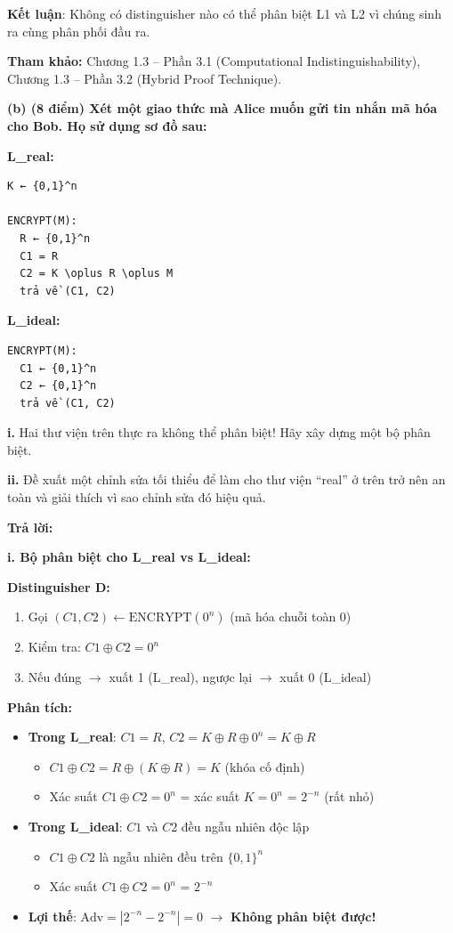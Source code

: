 \textbf{Kết luận}: Không có distinguisher nào có thể phân biệt L1 và L2 vì chúng sinh ra cùng phân phối đầu ra.

\textbf{Tham khảo:} Chương 1.3 – Phần 3.1 (Computational Indistinguishability), Chương 1.3 – Phần 3.2 (Hybrid Proof Technique).

\textbf{(b) (8 điểm) Xét một giao thức mà Alice muốn gửi tin nhắn mã hóa cho Bob. Họ sử dụng sơ đồ sau:}

\textbf{L\_real:}
\begin{verbatim}
K ← {0,1}^n

ENCRYPT(M):
  R ← {0,1}^n
  C1 = R
  C2 = K \oplus R \oplus M
  trả về (C1, C2)
\end{verbatim}

\textbf{L\_ideal:}
\begin{verbatim}
ENCRYPT(M):
  C1 ← {0,1}^n
  C2 ← {0,1}^n
  trả về (C1, C2)
\end{verbatim}

\textbf{i.} Hai thư viện trên thực ra không thể phân biệt! Hãy xây dựng một bộ phân biệt.

\textbf{ii.} Đề xuất một chỉnh sửa tối thiểu để làm cho thư viện ``real'' ở trên trở nên an toàn và giải thích vì sao chỉnh sửa đó hiệu quả.

\begin{center}
\textbf{Trả lời:}
\end{center}

\textbf{i. Bộ phân biệt cho L\_real vs L\_ideal:}

\textbf{Distinguisher D:}
\begin{enumerate}
    \item Gọi $(C1, C2) \leftarrow \text{ENCRYPT}(0^n)$ (mã hóa chuỗi toàn 0)
    \item Kiểm tra: $C1 \oplus C2 = 0^n$
    \item Nếu đúng $\rightarrow$ xuất 1 (L\_real), ngược lại $\rightarrow$ xuất 0 (L\_ideal)
\end{enumerate}

\textbf{Phân tích:}
\begin{itemize}
    \item \textbf{Trong L\_real}: $C1 = R$, $C2 = K \oplus R \oplus 0^n = K \oplus R$
    \begin{itemize}
        \item $C1 \oplus C2 = R \oplus (K \oplus R) = K$ (khóa cố định)
        \item Xác suất $C1 \oplus C2 = 0^n$ = xác suất $K = 0^n$ = $2^{-n}$ (rất nhỏ)
    \end{itemize}
    \item \textbf{Trong L\_ideal}: $C1$ và $C2$ đều ngẫu nhiên độc lập
    \begin{itemize}
        \item $C1 \oplus C2$ là ngẫu nhiên đều trên $\{0,1\}^n$
        \item Xác suất $C1 \oplus C2 = 0^n$ = $2^{-n}$
    \end{itemize}
    \item \textbf{Lợi thế}: $\text{Adv} = |2^{-n} - 2^{-n}| = 0$ $\rightarrow$ \textbf{Không phân biệt được!}
\end{itemize}

